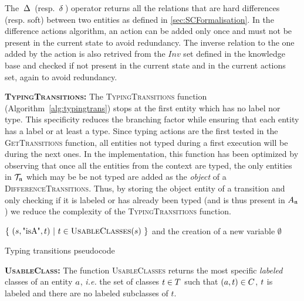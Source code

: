 \documentclass[a4paper,11pt,twoside]{StyleThese}
\begin{document}
The $\,\Delta\,$ (resp. $\,\delta\,$) operator returns all the relations that are hard differences (resp. soft) between two entities as defined in \ref{sec:SCFormalisation}. In the difference actions algorithm, an action can be added only once and must not be present in the current state to avoid redundancy. The inverse relation to the one added by the action is also retrived from the $Inv$ set defined in the knowledge base and checked if not present in the current state and in the current actions set, again to avoid redundancy. 

\textbf{\textsc{TypingTransitions}:}
The \textsc{TypingTransitions} function (Algorithm~\ref{alg:typingtrans}) stops at the first entity which has no label nor type. This specificity reduces the branching factor while ensuring that each entity has a label or at least a type. Since typing actions are the first tested in the \textsc{GetTransitions} function, all entities not typed during a first execution will be during the next ones. In the implementation, this function has been optimized by observing that once all the entities from the context are typed, the only entities in $\mathcal{T}_{\mathfrak{n}}$ which may be be not typed are added as the \textit{object} of a \textsc{DifferenceTransitions}. Thus, by storing the object entity of a transition and only checking if it is labeled or has already been typed (and is thus present in $A_{\mathfrak{n}}$) we reduce the complexity of the \textsc{TypingTransitions} function.

\begin{algorithm}[htb]
\begin{algorithmic}[1]
\State \Return $\{\ (s,\text{"isA"},t)\ |\ t \in \textsc{UsableClasses}(s)\ \} $ and the creation of a new variable 
\EndIf
\EndFor
\State \Return $\emptyset$
\EndFunction
\end{algorithmic}
 \caption{Typing transitions pseudocode}
 \label{alg:typingtrans}
\end{algorithm}

\textbf{\textsc{UsableClass}:}
The function \textsc{UsableClasses} returns the most specific \textit{labeled} classes of an entity $a$, \textit{i.e.} the set of classes $t \in T$ such that $(a, t) \in C$, $t$ is labeled and there are no labeled subclasses of $t$.
\end{document}
